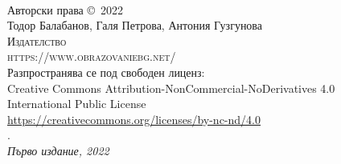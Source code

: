 ~\vfill
\thispagestyle{empty}

\noindent Авторски права \copyright\ 2022 \\

\noindent Тодор Балабанов, Галя Петрова, Антония Гузгунова \\ 

\noindent \textsc{Издателство } \\
\noindent \textsc{https://www.obrazovaniebg.net/} \\

\noindent Разпространява се под свободен лиценз: \\ 
Creative Commons Attribution-NonCommercial-NoDerivatives 4.0 \\
International Public License \\
\url{https://creativecommons.org/licenses/by-nc-nd/4.0} \\

. \\

\noindent \textit{Първо издание, 2022}